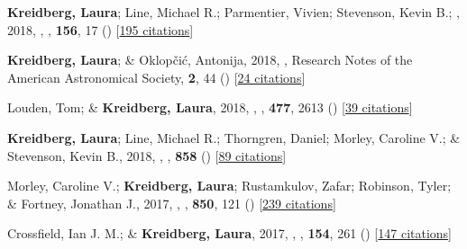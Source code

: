 \item[{\color{numcolor}\scriptsize13}] \textbf{Kreidberg, Laura}; Line, Michael R.; Parmentier, Vivien; Stevenson, Kevin B.; \etal, 2018, , \aj, \textbf{156}, 17 () [\href{https://ui.adsabs.harvard.edu/abs/2018AJ....156...17K}{195 citations}]

\item[{\color{numcolor}\scriptsize12}] \textbf{Kreidberg, Laura}; \& Oklop{\v{c}}i{\'c}, Antonija, 2018, , Research Notes of the American Astronomical Society, \textbf{2}, 44 () [\href{https://ui.adsabs.harvard.edu/abs/2018RNAAS...2...44K}{24 citations}]

\item[{\color{numcolor}\scriptsize11}] Louden, Tom; \& \textbf{Kreidberg, Laura}, 2018, , \mnras, \textbf{477}, 2613 () [\href{https://ui.adsabs.harvard.edu/abs/2018MNRAS.477.2613L}{39 citations}]

\item[{\color{numcolor}\scriptsize10}] \textbf{Kreidberg, Laura}; Line, Michael R.; Thorngren, Daniel; Morley, Caroline V.; \& Stevenson, Kevin B., 2018, , \apj, \textbf{858} () [\href{https://ui.adsabs.harvard.edu/abs/2018ApJ...858L...6K}{89 citations}]

\item[{\color{numcolor}\scriptsize9}] Morley, Caroline V.; \textbf{Kreidberg, Laura}; Rustamkulov, Zafar; Robinson, Tyler; \& Fortney, Jonathan J., 2017, , \apj, \textbf{850}, 121 () [\href{https://ui.adsabs.harvard.edu/abs/2017ApJ...850..121M}{239 citations}]

\item[{\color{numcolor}\scriptsize8}] Crossfield, Ian J. M.; \& \textbf{Kreidberg, Laura}, 2017, , \aj, \textbf{154}, 261 () [\href{https://ui.adsabs.harvard.edu/abs/2017AJ....154..261C}{147 citations}]

